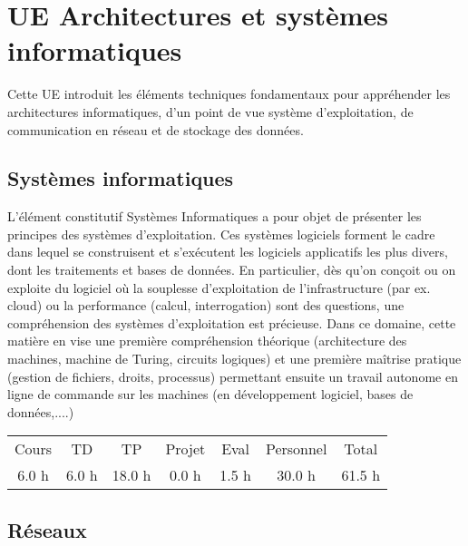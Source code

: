 \section{UE Architectures et systèmes informatiques}%
\label{sec:UEArchitecturesetsystmesinformatiques}%
Cette UE introduit les éléments techniques fondamentaux pour appréhender les architectures informatiques, d’un point de vue système d’exploitation, de communication en réseau et de stockage des données.%
\subsection{Systèmes informatiques}%
\label{subsec:Systmesinformatiques}%

%
L'élément constitutif Systèmes Informatiques a pour objet de présenter les principes des systèmes d'exploitation. Ces systèmes logiciels forment le cadre dans lequel se construisent et s'exécutent les logiciels applicatifs les plus divers, dont les traitements et bases de données. En particulier, dès qu'on conçoit ou on exploite du logiciel où la souplesse d'exploitation de l'infrastructure (par ex. cloud) ou la performance (calcul, interrogation) sont des questions, une compréhension des systèmes d'exploitation est précieuse. Dans ce domaine, cette matière en vise une première compréhension théorique (architecture des machines, machine de Turing, circuits logiques) et une première maîtrise pratique (gestion de fichiers, droits, processus) permettant ensuite un travail autonome en ligne de commande sur les machines (en développement logiciel, bases de données,....)%
\begin{longtable}{c c c c c c c}%
\hline%
Cours&TD&TP&Projet&Eval&Personnel&Total\\%
6.0 h&6.0 h&18.0 h&0.0 h&1.5 h&30.0 h&61.5 h\\%
\hline%
\end{longtable}%
\subsection{Réseaux}%
\label{subsec:Rseaux}%

